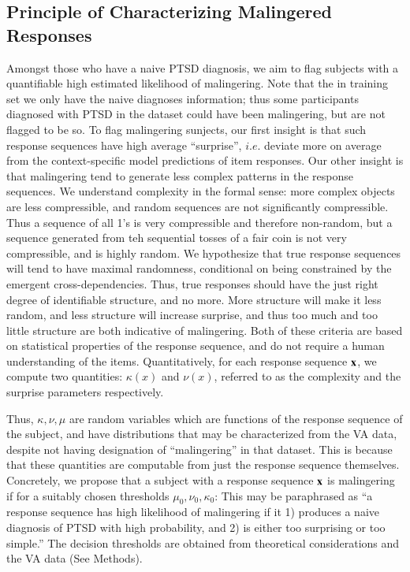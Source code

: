 \documentclass[onecolumn,10pt]{IEEEtran}
\def\Methods{Online Methods}
\def\Methods{Methods\xspace}
\begin{document}
\subsection*{Principle of Characterizing Malingered Responses}
Amongst those who have a naive PTSD diagnosis, we aim to flag subjects with  a quantifiable high estimated likelihood of malingering. Note that the in training set we only have the naive diagnoses information; thus some participants diagnosed with PTSD in the dataset could have been malingering, but are not flagged to be so. To flag malingering sunjects, our first insight  is that such response sequences  have high average ``surprise'', $i.e. $ deviate more on average from the context-specific model predictions of item responses. Our other insight is that malingering tend to generate  less complex patterns in the response sequences. We understand complexity in the formal sense: more complex objects are less compressible, and  random sequences are not significantly compressible. Thus a sequence of all 1's is very compressible and therefore non-random, but a sequence generated from teh sequential tosses of a fair coin is not very compressible, and is highly random. We hypothesize that true response sequences  will tend to have maximal randomness, conditional on  being constrained by the emergent cross-dependencies. Thus, true responses  should have the just right  degree of identifiable structure, and  no more. More structure will make it less random, and less structure will increase surprise, and thus too much and too little structure are both indicative of malingering. Both of these criteria are based on statistical properties of the response sequence, and do not require a human understanding of the items. Quantitatively, for each response sequence $\bm{\mathrm{x}}$, we compute two quantities: $\kappa(x)$ and  $\nu(x)$, referred to as the complexity  and the surprise parameters respectively.

Thus,  $\kappa, \nu, \mu$ are  random variables which are functions of the response sequence of the subject, and have distributions that may be characterized from the VA data, despite  not having designation of ``malingering'' in that  dataset. This is because that these quantities are computable from just the response sequence themselves. Concretely, we propose that a subject with a response sequence $\bm{\mathrm{x}}$  is malingering if for a suitably chosen thresholds $\mu_0,\nu_0, \kappa_0$:
This may be paraphrased as ``a response sequence has high likelihood of malingering if it 1)  produces a naive diagnosis of PTSD with high probability, and 2) is either too surprising or too simple.'' The decision thresholds are obtained from theoretical considerations and the VA data (See \Methods).
\end{document}
